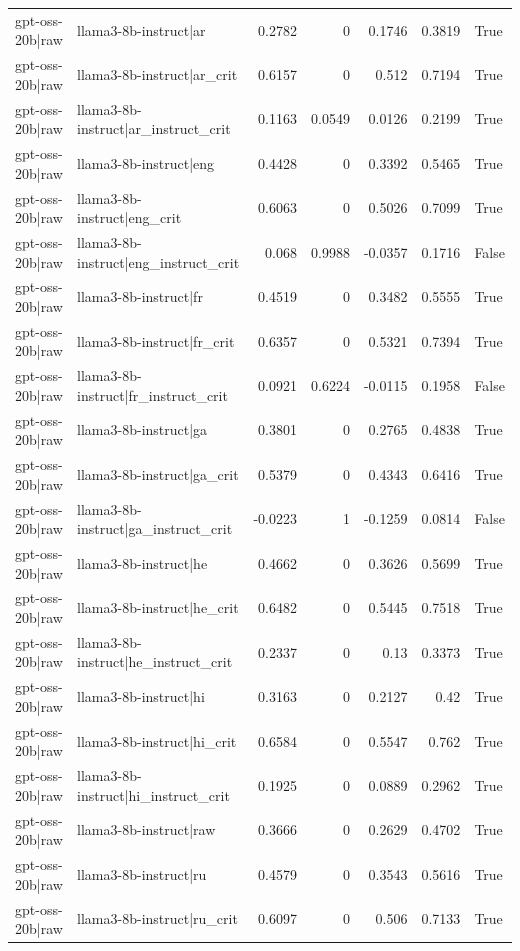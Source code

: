 \begin{table}
\begin{tabular}{l l r r r r l}
gpt-oss-20b|raw & llama3-8b-instruct|ar & 0.2782 & 0 & 0.1746 & 0.3819 & True \\
gpt-oss-20b|raw & llama3-8b-instruct|ar_crit & 0.6157 & 0 & 0.512 & 0.7194 & True \\
gpt-oss-20b|raw & llama3-8b-instruct|ar_instruct_crit & 0.1163 & 0.0549 & 0.0126 & 0.2199 & True \\
gpt-oss-20b|raw & llama3-8b-instruct|eng & 0.4428 & 0 & 0.3392 & 0.5465 & True \\
gpt-oss-20b|raw & llama3-8b-instruct|eng_crit & 0.6063 & 0 & 0.5026 & 0.7099 & True \\
gpt-oss-20b|raw & llama3-8b-instruct|eng_instruct_crit & 0.068 & 0.9988 & -0.0357 & 0.1716 & False \\
gpt-oss-20b|raw & llama3-8b-instruct|fr & 0.4519 & 0 & 0.3482 & 0.5555 & True \\
gpt-oss-20b|raw & llama3-8b-instruct|fr_crit & 0.6357 & 0 & 0.5321 & 0.7394 & True \\
gpt-oss-20b|raw & llama3-8b-instruct|fr_instruct_crit & 0.0921 & 0.6224 & -0.0115 & 0.1958 & False \\
gpt-oss-20b|raw & llama3-8b-instruct|ga & 0.3801 & 0 & 0.2765 & 0.4838 & True \\
gpt-oss-20b|raw & llama3-8b-instruct|ga_crit & 0.5379 & 0 & 0.4343 & 0.6416 & True \\
gpt-oss-20b|raw & llama3-8b-instruct|ga_instruct_crit & -0.0223 & 1 & -0.1259 & 0.0814 & False \\
gpt-oss-20b|raw & llama3-8b-instruct|he & 0.4662 & 0 & 0.3626 & 0.5699 & True \\
gpt-oss-20b|raw & llama3-8b-instruct|he_crit & 0.6482 & 0 & 0.5445 & 0.7518 & True \\
gpt-oss-20b|raw & llama3-8b-instruct|he_instruct_crit & 0.2337 & 0 & 0.13 & 0.3373 & True \\
gpt-oss-20b|raw & llama3-8b-instruct|hi & 0.3163 & 0 & 0.2127 & 0.42 & True \\
gpt-oss-20b|raw & llama3-8b-instruct|hi_crit & 0.6584 & 0 & 0.5547 & 0.762 & True \\
gpt-oss-20b|raw & llama3-8b-instruct|hi_instruct_crit & 0.1925 & 0 & 0.0889 & 0.2962 & True \\
gpt-oss-20b|raw & llama3-8b-instruct|raw & 0.3666 & 0 & 0.2629 & 0.4702 & True \\
gpt-oss-20b|raw & llama3-8b-instruct|ru & 0.4579 & 0 & 0.3543 & 0.5616 & True \\
gpt-oss-20b|raw & llama3-8b-instruct|ru_crit & 0.6097 & 0 & 0.506 & 0.7133 & True \\

\end{tabular}
\end{table}
